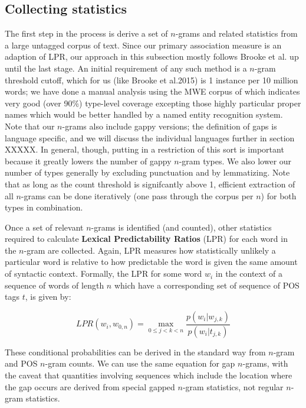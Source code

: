\documentclass[11pt]{article}
\makeatletter
\def \al {al.\@ }
\newcommand{\termdef}[1]{\textbf{#1}\xspace}
\makeatother
\begin{document}
\subsection{Collecting statistics}

The first step in the process is derive a set of $n$-grams and related statistics from a large untagged corpus of text. Since our primary association measure is an adaption of LPR, our approach in this subsection mostly follows Brooke et \al {} up until the last stage. An initial requirement of any such method is a $n$-gram threshold cutoff, which for us (like Brooke et \al 2015) is 1 instance per 10 million words; we have done a manual analysis using the MWE corpus of \cite{Schneider14a} which indicates very good (over 90\%) type-level coverage excepting those highly particular proper names which would be better handled by a named entity recognition system. Note that our $n$-grams also include gappy versions; the definition of gaps is language specific, and we will discuss the individual languages further in section XXXXX. In general, though, putting in a restriction of this sort is important because it greatly lowers the number of gappy $n$-gram types. We also lower our number of types generally by excluding punctuation and by lemmatizing.  Note that as long as the count threshold is signifcantly above 1, efficient extraction of all $n$-grams can be done iteratively (one pass through the corpus per $n$) for both types in combination. 

Once a set of relevant $n$-grams is identified (and counted), other statistics required to calculate \termdef{Lexical Predictability Ratios} (LPR) for each word in the $n$-gram are collected. Again, LPR measures how statistically unlikely a particular word is relative to how predictable the word is given the same amount of syntactic context. Formally, the LPR for some word $w_i$ in the context of a sequence of words of length $n$ which have a corresponding set of sequence of POS tags $t$, is given by:

\begin{displaymath}
LPR(w_i,w_{0,n}) = \max_{0 \leq j < k < n }{\frac{p(w_i|w_{j,k})}{p(w_i|t_{j,k})}}
\end{displaymath}

These conditional probabilities can be derived in the standard way from $n$-gram and POS $n$-gram counts. We can use the same equation for gap $n$-grams, with the caveat that quantities involving sequences which include the location where the gap occurs are derived from special gapped $n$-gram statistics, not regular $n$-gram statistics.  
\end{document}
